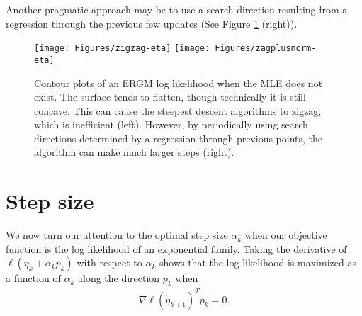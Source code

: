 Another pragmatic approach may be to use a search direction resulting from a regression
through the previous few updates (See Figure \ref{F:zigzag} (right)).


\begin{figure}[!ht]
\centering
\texttt{[image: Figures/zigzag-eta]}
\texttt{[image: Figures/zagplusnorm-eta]}
\caption[Contour plots of ERGM log likelihood when MLE does not exist]{Contour plots of an ERGM log likelihood when the MLE does not exist.  The surface 
tends to flatten, though technically it is still concave.  This can cause 
the steepest descent 
algorithms to zigzag, which is inefficient (left).  However, by periodically using 
search directions 
determined by 
a regression through 
previous points, the algorithm can make much larger steps (right).}
\label{F:zigzag}
\end{figure}

\section{Step size} \label{S:Step size}
We now turn our attention to the optimal step size $\alpha_k$ when our objective 
function is the log likelihood of an 
exponential family.  Taking the derivative of $\ell( \eta_k + \alpha_k p_k)$ with 
respect to $\alpha_k$ shows that the 
log likelihood is maximized as a function of $\alpha_k$ along the direction $p_k$  
when 
\begin{align*}
	\nabla \ell( \eta_{k+1} )^T p_k = 0.
\end{align*}

